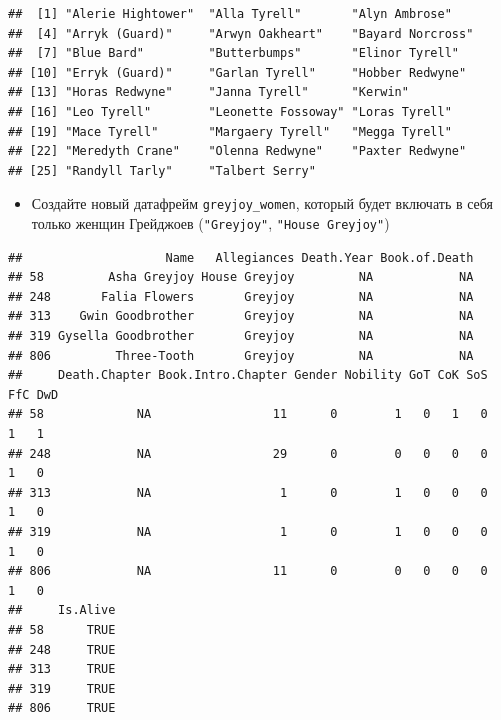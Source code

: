\documentclass[]{book}
\newenvironment{Shaded}{\begin{snugshade}}{\end{snugshade}}
\newcommand{\DecValTok}[1]{\textcolor[rgb]{0.00,0.00,0.81}{#1}}
\newcommand{\KeywordTok}[1]{\textcolor[rgb]{0.13,0.29,0.53}{\textbf{#1}}}
\newcommand{\NormalTok}[1]{#1}
\newcommand{\OperatorTok}[1]{\textcolor[rgb]{0.81,0.36,0.00}{\textbf{#1}}}
\newcommand{\StringTok}[1]{\textcolor[rgb]{0.31,0.60,0.02}{#1}}
\providecommand{\tightlist}{%
  \setlength{\itemsep}{0pt}\setlength{\parskip}{0pt}}
\begin{document}
\begin{Shaded}
\end{Shaded}

\begin{verbatim}
##  [1] "Alerie Hightower"  "Alla Tyrell"       "Alyn Ambrose"     
##  [4] "Arryk (Guard)"     "Arwyn Oakheart"    "Bayard Norcross"  
##  [7] "Blue Bard"         "Butterbumps"       "Elinor Tyrell"    
## [10] "Erryk (Guard)"     "Garlan Tyrell"     "Hobber Redwyne"   
## [13] "Horas Redwyne"     "Janna Tyrell"      "Kerwin"           
## [16] "Leo Tyrell"        "Leonette Fossoway" "Loras Tyrell"     
## [19] "Mace Tyrell"       "Margaery Tyrell"   "Megga Tyrell"     
## [22] "Meredyth Crane"    "Olenna Redwyne"    "Paxter Redwyne"   
## [25] "Randyll Tarly"     "Talbert Serry"
\end{verbatim}

\begin{itemize}
\tightlist
\item
  Создайте новый датафрейм \texttt{greyjoy\_women}, который будет включать в себя только женщин Грейджоев (\texttt{"Greyjoy"}, \texttt{"House\ Greyjoy"})
\end{itemize}

\begin{Shaded}
\end{Shaded}

\begin{verbatim}
##                    Name   Allegiances Death.Year Book.of.Death
## 58         Asha Greyjoy House Greyjoy         NA            NA
## 248       Falia Flowers       Greyjoy         NA            NA
## 313    Gwin Goodbrother       Greyjoy         NA            NA
## 319 Gysella Goodbrother       Greyjoy         NA            NA
## 806         Three-Tooth       Greyjoy         NA            NA
##     Death.Chapter Book.Intro.Chapter Gender Nobility GoT CoK SoS FfC DwD
## 58             NA                 11      0        1   0   1   0   1   1
## 248            NA                 29      0        0   0   0   0   1   0
## 313            NA                  1      0        1   0   0   0   1   0
## 319            NA                  1      0        1   0   0   0   1   0
## 806            NA                 11      0        0   0   0   0   1   0
##     Is.Alive
## 58      TRUE
## 248     TRUE
## 313     TRUE
## 319     TRUE
## 806     TRUE
\end{verbatim}
\end{document}
